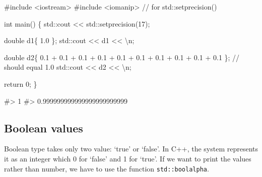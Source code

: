 \documentclass[
  letterpaper,
  DIV=11,
  numbers=noendperiod]{scrreprt}
\newenvironment{Shaded}{\begin{snugshade}}{\end{snugshade}}
\newcommand{\CommentTok}[1]{\textcolor[rgb]{0.37,0.37,0.37}{#1}}
\newcommand{\DecValTok}[1]{\textcolor[rgb]{0.68,0.00,0.00}{#1}}
\newcommand{\ErrorTok}[1]{\textcolor[rgb]{0.68,0.00,0.00}{#1}}
\newcommand{\FloatTok}[1]{\textcolor[rgb]{0.68,0.00,0.00}{#1}}
\newcommand{\FunctionTok}[1]{\textcolor[rgb]{0.28,0.35,0.67}{#1}}
\newcommand{\NormalTok}[1]{\textcolor[rgb]{0.00,0.23,0.31}{#1}}
\newcommand{\SpecialCharTok}[1]{\textcolor[rgb]{0.37,0.37,0.37}{#1}}
\newcommand{\StringTok}[1]{\textcolor[rgb]{0.13,0.47,0.30}{#1}}
\begin{document}
\begin{Shaded}
\begin{Highlighting}[]
\CommentTok{\#include \textless{}iostream\textgreater{}}
\CommentTok{\#include \textless{}iomanip\textgreater{}      // for std::setprecision()}

\NormalTok{int }\FunctionTok{main}\NormalTok{()}
\NormalTok{\{}
\NormalTok{    std}\SpecialCharTok{::}\NormalTok{cout }\SpecialCharTok{\textless{}}\ErrorTok{\textless{}}\NormalTok{ std}\SpecialCharTok{::}\FunctionTok{setprecision}\NormalTok{(}\DecValTok{17}\NormalTok{);}

\NormalTok{    double d1\{ }\FloatTok{1.0}\NormalTok{ \};}
\NormalTok{    std}\SpecialCharTok{::}\NormalTok{cout }\SpecialCharTok{\textless{}}\ErrorTok{\textless{}}\NormalTok{ d1 }\SpecialCharTok{\textless{}}\ErrorTok{\textless{}} \StringTok{\textquotesingle{}}\SpecialCharTok{\textbackslash{}n}\StringTok{\textquotesingle{}}\NormalTok{;}

\NormalTok{    double d2\{ }\FloatTok{0.1} \SpecialCharTok{+} \FloatTok{0.1} \SpecialCharTok{+} \FloatTok{0.1} \SpecialCharTok{+} \FloatTok{0.1} \SpecialCharTok{+} \FloatTok{0.1} \SpecialCharTok{+} \FloatTok{0.1} \SpecialCharTok{+} \FloatTok{0.1} \SpecialCharTok{+} \FloatTok{0.1} \SpecialCharTok{+} \FloatTok{0.1} \SpecialCharTok{+} \FloatTok{0.1}\NormalTok{ \}; }\SpecialCharTok{/}\ErrorTok{/}\NormalTok{ should equal }\FloatTok{1.0}
\NormalTok{    std}\SpecialCharTok{::}\NormalTok{cout }\SpecialCharTok{\textless{}}\ErrorTok{\textless{}}\NormalTok{ d2 }\SpecialCharTok{\textless{}}\ErrorTok{\textless{}} \StringTok{\textquotesingle{}}\SpecialCharTok{\textbackslash{}n}\StringTok{\textquotesingle{}}\NormalTok{;}

\NormalTok{    return }\DecValTok{0}\NormalTok{;}
\NormalTok{\}}

\CommentTok{\#\textgreater{} 1}
\CommentTok{\#\textgreater{} 0.999999999999999999999999}
\end{Highlighting}
\end{Shaded}

\hypertarget{boolean-values}{%
\subsection{Boolean values}\label{boolean-values}}

Boolean type takes only two value: `true' or `false'. In C++, the system
represents it as an integer which 0 for `false' and 1 for `true'. If we
want to print the values rather than number, we have to use the function
\texttt{std::boolalpha}.
\end{document}
